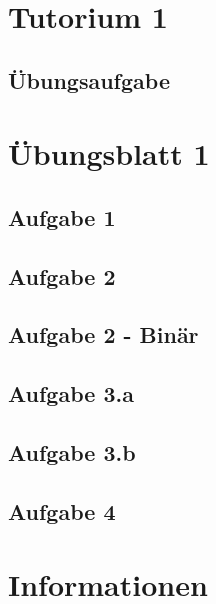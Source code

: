 \documentclass[aspectratio=169,usepdftitle=true,11pt,ngerman,t]{beamer}
\subtitle{Tutorium 2}
\date{25. Oktober 2024}
\begin{document}
\section[Noch zu letztem Tutorium...]{Tutorium 1}

\subsection{Übungsaufgabe}


\section[Kann ja nur noch besser werden...]{Übungsblatt 1}

\subsection{Aufgabe 1}


\subsection{Aufgabe 2}


\subsection{Aufgabe 2 - Binär}
\addtocounter{exercise}{-1}\addtocounter{solve}{-1} %


\subsection{Aufgabe 3.a}


\subsection{Aufgabe 3.b}
\addtocounter{exercise}{-1}\addtocounter{solve}{-1} %


\subsection{Aufgabe 4}


\section[Ein bisschen was zum Schluss]{Informationen}
\end{document}
